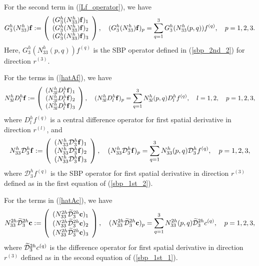 For the second term in (\ref{Lf_operator}), we have
\begin{align*}\label{3_10_2}
{{G}}_3^{h}({N}_{33}^{h}){\bf f} := \left(\begin{array}{c}
({{G}}_3^{h}({N}_{33}^{h}){\bf f})_1 \\
({{G}}_3^{h}({N}_{33}^{h}){\bf f})_2 \\
({{G}}_3^{h}({N}_{33}^{h}){\bf f})_3 
\end{array}\right), \quad ({{G}}_3^{h}({N}_{33}^{h}){\bf f})_p = \sum_{q = 1}^{3} {G}_3^{h}(N_{33}^{h}(p,q)) {f}^{(q)},\quad p = 1,2,3.
\end{align*}
Here, ${G}_3^{h}(N_{33}^{h}(p,q)) {f}^{(q)}$ is the SBP operator defined in (\ref{sbp_2nd_2}) for direction $r^{(3)}$. 

For the terms in (\ref{hatAf}), we have
\begin{align*}\label{gamma_D} 
{N}_{3l}^hD_l^h{\bf f} := \left(\begin{array}{c}
({N}_{3l}^hD_l^h{\bf f})_1 \\
({N}_{3l}^hD_l^h{\bf f})_2 \\
({N}_{3l}^hD_l^h{\bf f})_3 
\end{array}\right), \quad ({N}_{3l}^hD_l^h{\bf f})_p = \sum_{q = 1}^{3} N_{3l}^h(p,q)D_l^h{f}^{(q)},\quad l = 1,2, \quad p = 1,2,3,
\end{align*}
where $D_l^h{f}^{(q)}$ is a central difference operator for first spatial derivative in direction $r^{(l)}$, and
\begin{align*}\label{gamma_D1}
{N}_{33}^h\mathcal{D}_3^h{\bf f} := \left(\begin{array}{c}
({N}_{33}^h\mathcal{D}_3^h{\bf f})_1 \\
({N}_{33}^h\mathcal{D}_3^h{\bf f})_2 \\
({N}_{33}^h\mathcal{D}_3^h{\bf f})_3 
\end{array}\right), \quad ({N}_{33}^h\mathcal{D}_3^h{\bf f})_p = \sum_{q = 1}^{3} N_{33}^h(p,q)\mathcal{D}_3^h{f}^{(q)},\quad p = 1,2,3,
\end{align*}
where $\mathcal{D}_3^h{f}^{(q)}$ is the SBP operator for first spatial derivative in direction $r^{(3)}$ defined as in the first equation of (\ref{sbp_1st_2}).

For the terms in (\ref{hatAc}), we have
\begin{align*}\label{3_17}
{N}_{33}^{2h}\wt{\mathcal{D}}_3^{2h}{\bf c} := \left(\begin{array}{c}
({N}_{33}^{2h}\wt{\mathcal{D}}_3^{2h}{\bf c})_1 \\
({N}_{33}^{2h}\wt{\mathcal{D}}_3^{2h}{\bf c})_2 \\
({N}_{33}^{2h}\wt{\mathcal{D}}_3^{2h}{\bf c})_3 
\end{array}\right), \quad ({N}_{33}^{2h}\wt{\mathcal{D}}_3^{2h}{\bf c})_p = \sum_{q = 1}^{3} N_{33}^{2h}(p,q)\wt{\mathcal{D}}_3^{2h}{c}^{(q)},\quad p = 1,2,3,
\end{align*}
where $\widetilde{\mathcal{D}}_3^{2h}{c}^{(q)}$ is the difference operator for first spatial derivative in direction $r^{(3)}$ defined as in the second equation of (\ref{sbp_1st_1}).

